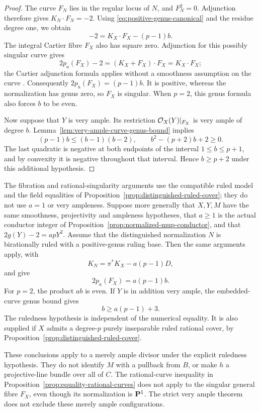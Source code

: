 \begin{proof}
The curve $F_N$ lies in the regular locus of $N$, and $F_N^2=0$.
Adjunction therefore gives $K_N\cdot F_N=-2$.
Using \eqref{eq:positive-genus-canonical} and the residue degree one,
we obtain
\[
 -2=K_X\cdot F_X-(p-1)b.
\]
The integral Cartier fibre $F_X$ also has square zero. Adjunction
for this possibly singular curve gives
\[
 2p_a(F_X)-2=(K_X+F_X)\cdot F_X=K_X\cdot F_X;
\]
the Cartier adjunction formula applies without a smoothness
assumption on the curve \cite[Tags~0AA4 and~0A9X]{Stacks}.
Consequently $2p_a(F_X)=(p-1)b$. It is positive, whereas the
normalization has genus zero, so $F_X$ is singular.
When $p=2$, this genus formula also forces $b$ to be even.

Now suppose that $Y$ is very ample.
Its restriction $\mathcal O_X(Y)|_{F_X}$ is very ample of degree $b$.
Lemma~\ref{lem:very-ample-curve-genus-bound} implies
\[
 (p-1)b\leq(b-1)(b-2),
 \qquad b^2-(p+2)b+2\geq0.
\]
The last quadratic is negative at both endpoints of the interval
$1\leq b\leq p+1$, and by convexity it is negative throughout that
interval. Hence $b\geq p+2$ under this additional hypothesis.
\end{proof}

\begin{remark}\label{rem:positive-genus-higher-conductor}
The fibration and rational-singularity arguments use the compatible
ruled model and the field equalities of
Proposition~\ref{prop:distinguished-ruled-cover}; they do not use
$a=1$ or very ampleness. Suppose more generally that $X,Y,M$ have
the same smoothness, projectivity and ampleness hypotheses, that
$a\geq1$ is the actual conductor integer of
Proposition~\ref{prop:normalized-mup-conductor}, and that
$2g(Y)-2=apY^2$. Assume that the distinguished normalization $N$
is birationally ruled with a positive-genus ruling base.
Then the same arguments apply, with
\[
 K_N=\pi^*K_X-a(p-1)D,
\]
and give
\[
 2p_a(F_X)=a(p-1)b.
\]
For $p=2$, the product $ab$ is even.
If $Y$ is in addition very ample, the embedded-curve genus bound gives
\[
 b\geq a(p-1)+3.
\]
The ruledness hypothesis is independent of the numerical equality.
It is also supplied if $X$ admits a degree-$p$ purely inseparable
ruled rational cover, by
Proposition~\ref{prop:distinguished-ruled-cover}.
\end{remark}

These conclusions apply to a merely ample divisor under the explicit
ruledness hypothesis. They do not identify $M$ with a pullback from
$B$, or make $h$ a projective-line bundle over all of $C$.
The rational-curve inequality in
Proposition~\ref{prop:equality-rational-curves} does not apply to the
singular general fibre $F_X$, even though its normalization is
$\mathbf P^1$. The strict very ample theorem does not exclude these
merely ample configurations.
